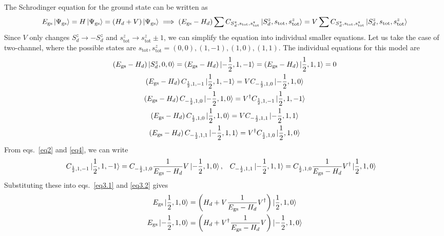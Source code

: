 \documentclass{revtex4-2}
\numberwithin{equation}{section}
\begin{document}
The Schrodinger equation for the ground state can be written as
\begin{equation}\begin{aligned}
	E_\text{gs}\ket{\Psi_\text{gs}} = H \ket{\Psi_\text{gs}} = \left(H_d + V\right)\ket{\Psi_\text{gs}} \implies \left(E_\text{gs} - H_d\right)\sum C_{S_d^z, s_\text{tot},s_\text{tot}^z}\ket{S_d^z, s_\text{tot}, s_\text{tot}^z} = V\sum C_{S_d^z, s_\text{tot},s_\text{tot}^z}\ket{S_d^z, s_\text{tot}, s_\text{tot}^z}
\end{aligned}\end{equation}
Since \(V\) only changes \(S_d^z \to -S_d^z\) and \(s^z_\text{tot} \to s^z_\text{tot} \pm 1\), we can simplify the equation into individual smaller equations. Let us take the case of two-channel, where the possible states are \(s_\text{tot},s^z_\text{tot} = (0,0), (1,-1), (1,0), (1,1)\). The individual equations for this model are
\begin{gather}
	\left(E_\text{gs} - H_d\right) \ket{S_d^z, 0, 0} = \left(E_\text{gs} - H_d\right) \ket{-\frac{1}{2}, 1, -1} = \left(E_\text{gs} - H_d\right) \ket{\frac{1}{2}, 1, 1}  = 0 \label{no_V}\\
	\left(E_\text{gs} - H_d\right) C_{\frac{1}{2}, 1, -1}\ket{\frac{1}{2}, 1, -1} = V C_{-\frac{1}{2}, 1, 0}\ket{-\frac{1}{2}, 1, 0}\label{eq2}\\
	\left(E_\text{gs} - H_d\right) C_{-\frac{1}{2}, 1, 0}\ket{-\frac{1}{2}, 1, 0} = V^\dagger C_{\frac{1}{2}, 1, -1}\ket{\frac{1}{2}, 1, -1}\label{eq3.2}\\
	\left(E_\text{gs} - H_d\right) C_{\frac{1}{2}, 1, 0}\ket{\frac{1}{2}, 1, 0} = V C_{-\frac{1}{2}, 1, 1}\ket{-\frac{1}{2}, 1, 1} \label{eq3.1}\\
	\left(E_\text{gs} - H_d\right) C_{-\frac{1}{2}, 1, 1}\ket{-\frac{1}{2}, 1, 1} = V^\dagger C_{\frac{1}{2}, 1, 0}\ket{\frac{1}{2}, 1, 0}\label{eq4}
\end{gather}
From eqs.~\ref{eq2} and \ref{eq4}, we can write
\begin{equation}\begin{aligned}
	C_{\frac{1}{2}, 1, -1}\ket{\frac{1}{2}, 1, -1} &= C_{-\frac{1}{2}, 1, 0}\frac{1}{E_\text{gs} - H_d}V \ket{-\frac{1}{2}, 1, 0}, &&C_{-\frac{1}{2}, 1, 1}\ket{-\frac{1}{2}, 1, 1} = C_{\frac{1}{2}, 1, 0}\frac{1}{E_\text{gs} - H_d}V^\dagger \ket{\frac{1}{2}, 1, 0}
\end{aligned}\end{equation}
Substituting these into eqs.~\ref{eq3.1} and \ref{eq3.2} gives 
\begin{equation}\begin{aligned}
	\label{eff_ham_Sdz_10}
	E_\text{gs} \ket{\frac{1}{2}, 1, 0} &= \left(H_d + V \frac{1}{E_\text{gs} - H_d}V^\dagger\right) \ket{\frac{1}{2}, 1, 0}\\
	E_\text{gs} \ket{-\frac{1}{2}, 1, 0} &= \left(H_d + V^\dagger \frac{1}{E_\text{gs} - H_d} V\right) \ket{-\frac{1}{2}, 1, 0}\\
\end{aligned}\end{equation}
\end{document}
